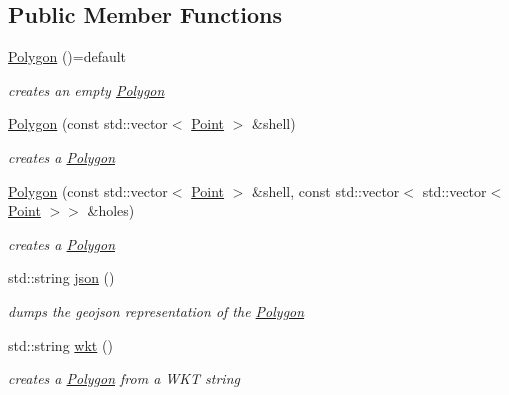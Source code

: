 \subsection*{Public Member Functions}
\begin{DoxyCompactItemize}
\item 
\hyperlink{classsimo_1_1shapes_1_1_polygon_a3069cb0007400aea8ae6ae2aa5041bfe}{Polygon} ()=default
\begin{DoxyCompactList}\small\item\em creates an empty \hyperlink{classsimo_1_1shapes_1_1_polygon}{Polygon} \end{DoxyCompactList}\item 
\hyperlink{classsimo_1_1shapes_1_1_polygon_a40b5518aefa6bb6992ec6bfc5ed90c2b}{Polygon} (const std\-::vector$<$ \hyperlink{classsimo_1_1shapes_1_1_point}{Point} $>$ \&shell)
\begin{DoxyCompactList}\small\item\em creates a \hyperlink{classsimo_1_1shapes_1_1_polygon}{Polygon} \end{DoxyCompactList}\item 
\hyperlink{classsimo_1_1shapes_1_1_polygon_a26336c46677a50f571dcd5651cccf869}{Polygon} (const std\-::vector$<$ \hyperlink{classsimo_1_1shapes_1_1_point}{Point} $>$ \&shell, const std\-::vector$<$ std\-::vector$<$ \hyperlink{classsimo_1_1shapes_1_1_point}{Point} $>$$>$ \&holes)
\begin{DoxyCompactList}\small\item\em creates a \hyperlink{classsimo_1_1shapes_1_1_polygon}{Polygon} \end{DoxyCompactList}\item 
std\-::string \hyperlink{classsimo_1_1shapes_1_1_polygon_adb65017c154a1907db5c7e70a721183e}{json} ()
\begin{DoxyCompactList}\small\item\em dumps the geojson representation of the \hyperlink{classsimo_1_1shapes_1_1_polygon}{Polygon} \end{DoxyCompactList}\item 
std\-::string \hyperlink{classsimo_1_1shapes_1_1_polygon_aac48a301f6b32faf9ffc1e42bd281857}{wkt} ()
\begin{DoxyCompactList}\small\item\em creates a \hyperlink{classsimo_1_1shapes_1_1_polygon}{Polygon} from a W\-K\-T string \end{DoxyCompactList}\end{DoxyCompactItemize}
